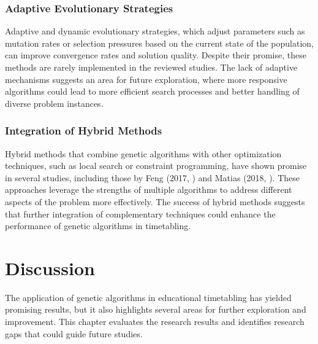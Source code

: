 \documentclass[sigconf]{acmart}
\begin{document}
\subsubsection{Adaptive Evolutionary Strategies}
Adaptive and dynamic evolutionary strategies, which adjust parameters such as
mutation rates or selection pressures based on the current state of the
population, can improve convergence rates and solution quality.
Despite their promise, these methods are rarely implemented in the reviewed
studies. The lack of adaptive mechanisms suggests an area for future
exploration, where more responsive algorithms could lead to more efficient
search processes and better handling of diverse problem instances.


\subsubsection{Integration of Hybrid Methods}
Hybrid methods that combine genetic algorithms with other optimization
techniques, such as local search or constraint programming, have shown promise
in several studies, including those by Feng (2017, \cite{Feng2017}) and Matias
(2018, \cite{Matias2018fair}). These approaches leverage the strengths of
multiple algorithms to address different aspects of the problem more
effectively. The success of hybrid methods suggests that further integration of
complementary techniques could enhance the performance of genetic algorithms
in timetabling.


\section{Discussion}
The application of genetic algorithms in educational timetabling has yielded
promising results, but it also highlights several areas for further exploration
and improvement.
This chapter evaluates the research results and identifies research gaps that
could guide future studies.
\end{document}
